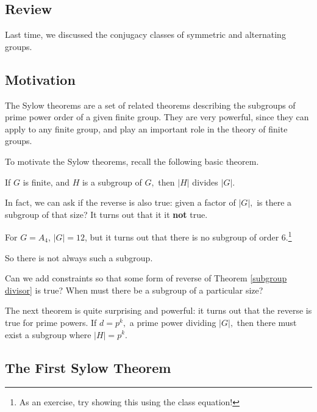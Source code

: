\subsection{Review}

Last time, we discussed the conjugacy classes of symmetric and alternating groups.



\subsection{Motivation}

The Sylow theorems are a set of related theorems describing the subgroups of prime power order of a given finite group. They are very powerful, since they can apply to any finite group, and play an important role in the theory of finite groups. 

To motivate the Sylow theorems, recall the following basic theorem. 

\begin{theorem}\label{subgroup divisor}
If $G$ is finite, and $H$ is a subgroup of $G,$ then $|H|$ divides $|G|.$ 
\end{theorem}

In fact, we can ask if the reverse is also true: given a factor of $|G|,$ is there a subgroup of that size? It turns out that it it \textbf{not} true. 

\begin{example}[Counterexample]
For $G = A_4$, $|G| = 12$, but it turns out that there is no subgroup of order 6.\footnote{As an exercise, try showing this using the class equation!}
\end{example}

So there is not always such a subgroup. 

\begin{qq}
Can we add constraints so that some form of reverse of Theorem \ref{subgroup divisor} is true? When must there be a subgroup of a particular size?
\end{qq}

The next theorem is quite surprising and powerful: it turns out that the reverse is true for prime powers. If $d = p^k,$ a prime power dividing $|G|,$ then there must exist a subgroup where $|H| = p^k.$

\subsection{The First Sylow Theorem}

